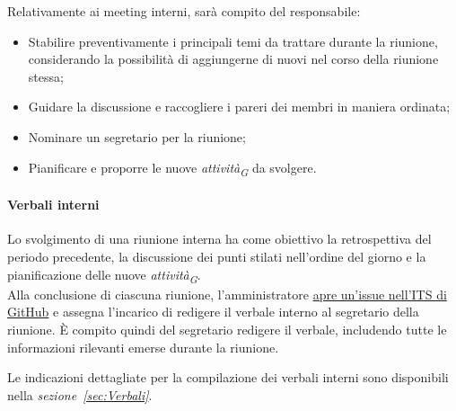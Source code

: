 Relativamente ai meeting interni, sarà compito del responsabile:
\begin{itemize}
    \item Stabilire preventivamente i principali temi da trattare durante la riunione, considerando la possibilità di aggiungerne di nuovi nel corso della riunione stessa;
    \item Guidare la discussione e raccogliere i pareri dei membri in maniera ordinata;
    \item Nominare un segretario per la riunione;
    \item Pianificare e proporre le nuove \textit{attività}\textsubscript{\textit{G}} da svolgere.
\end{itemize}

\hypertarget{par:verbaliInterni}{\paragraph*{Verbali interni}}
Lo svolgimento di una riunione interna ha come obiettivo la retrospettiva del periodo precedente, la discussione dei punti stilati nell'ordine del giorno e la pianificazione delle nuove \textit{attività}\textsubscript{\textit{G}}. \\
Alla conclusione di ciascuna riunione, l'amministratore \hyperlink{par:ticketing}{apre un'issue nell'ITS di GitHub} e assegna l'incarico di redigere il verbale interno al segretario della riunione. È compito quindi del segretario redigere il verbale, includendo tutte le informazioni rilevanti emerse durante la riunione.

Le indicazioni dettagliate per la compilazione dei verbali interni sono disponibili nella \textit{sezione~\ref{sec:Verbali}}.

